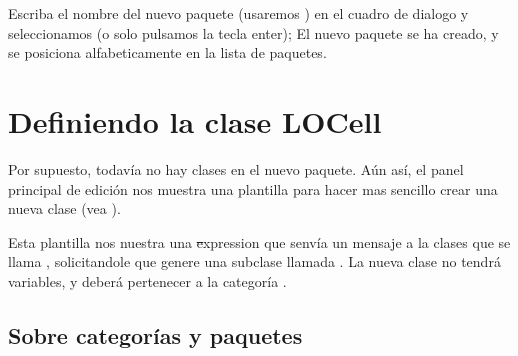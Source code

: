\documentclass[a4paper,10pt,twoside]{book}
\begin{document}

Escriba el nombre del nuevo paquete (usaremos ) en
el cuadro de dialogo y seleccionamos  (o solo pulsamos
la tecla enter); El nuevo paquete se ha creado, y se posiciona alfabeticamente
en la lista de paquetes.

\section{Definiendo la clase LOCell}


Por supuesto, todavía no hay clases en el nuevo paquete. Aún así, el panel
principal de edición nos muestra una plantilla para hacer mas sencillo crear
una nueva clase (vea ).




Esta plantilla nos nuestra una \st expression que senvía un mensaje a la clases
que se llama , solicitandole que genere una subclase llamada
. La nueva clase no tendrá variables, y deberá pertenecer
a la categoría .

\subsection{Sobre categorías y paquetes}
\end{document}
